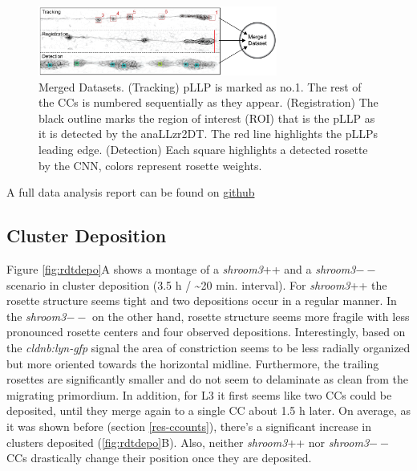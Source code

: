 \documentclass[11pt,singlespacinge,twoside]{reedthesis} %
\begin{document}
\begin{figure}

{\centering \includegraphics[width=0.7\textwidth]{figures/results/03_rosettes/RDT-01} 

}

\caption[RDT Merged Datasets]{Merged Datasets. (Tracking) pLLP is marked as no.1. The rest of the CCs is numbered sequentially as they appear. (Registration) The black outline marks the region of interest (ROI) that is the pLLP as it is detected by the anaLLzr2DT. The red line highlights the pLLPs leading edge. (Detection) Each square highlights a detected rosette by the CNN, colors represent rosette weights.}\label{fig:rdt}
\end{figure}
A full data analysis report can be found on \href{https://github.com/KleinhansDa/reports/blob/master/b7a875fc1ea228b9061041b7cec4bd3c52ab3ce3/report_RDT.html}{github}

\hypertarget{cluster-deposition}{%
\subsection{Cluster Deposition}\label{cluster-deposition}}

Figure \ref{fig:rdtdepo}A shows a montage of a \emph{shroom3}++ and a \emph{shroom3}\(--\) scenario in cluster deposition (3.5 h / \textasciitilde{}20 min. interval). For \emph{shroom3}++ the rosette structure seems tight and two depositions occur in a regular manner. In the \emph{shroom3}\(--\) on the other hand, rosette structure seems more fragile with less pronounced rosette centers and four observed depositions. Interestingly, based on the \emph{cldnb:lyn-gfp} signal the area of constriction seems to be less radially organized but more oriented towards the horizontal midline. Furthermore, the trailing rosettes are significantly smaller and do not seem to delaminate as clean from the migrating primordium. In addition, for L3 it first seems like two CCs could be deposited, until they merge again to a single CC about 1.5 h later.
On average, as it was shown before (section \ref{res-ccounts}), there's a significant increase in clusters deposited (\ref{fig:rdtdepo}B). Also, neither \emph{shroom3}++ nor \emph{shroom3}\(--\) CCs drastically change their position once they are deposited.
\end{document}
